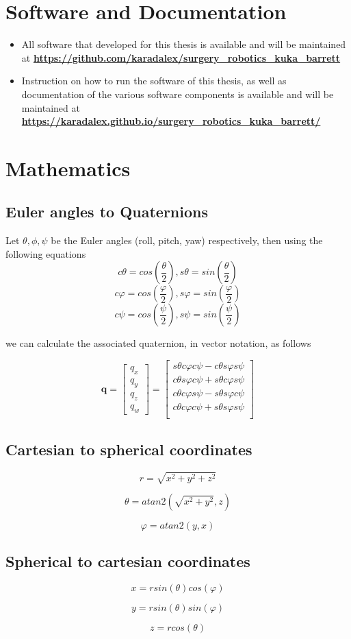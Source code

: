 \section{Software and Documentation}

\begin{itemize}
\item All software that developed for this thesis is available and will be maintained at \textbf{\url{https://github.com/karadalex/surgery_robotics_kuka_barrett}}
\item Instruction on how to run the software of this thesis, as well as documentation of the various software components is available and will be maintained at 
	\textbf{\url{https://karadalex.github.io/surgery_robotics_kuka_barrett/}}
\end{itemize}

\section{Mathematics}

\subsection{Euler angles to Quaternions}

Let $\theta, \phi, \psi$ be the Euler angles (roll, pitch, yaw) respectively, then using the following equations
\[
cθ = cos\left( \frac{θ}{2} \right) , sθ = sin\left( \frac{θ}{2} \right)
\]
\[
cφ = cos\left( \frac{φ}{2} \right) , sφ = sin\left( \frac{φ}{2} \right)
\]
\[
cψ = cos\left( \frac{ψ}{2} \right) , sψ = sin\left( \frac{ψ}{2} \right)
\]

we can calculate the associated quaternion, in vector notation, as follows

\[
\mathbf{q} = \begin{bmatrix} q_x \\ q_y \\ q_z \\ q_w \end{bmatrix} = \begin{bmatrix}
sθcφcψ - cθsφsψ \\
cθsφcψ + sθcφsψ \\
cθcφsψ - sθsφcψ \\
cθcφcψ + sθsφsψ \\
\end{bmatrix}
\]

\subsection{Cartesian to spherical coordinates}

\[
r = \sqrt{x^2+y^2+z^2}
\]

\[
θ = atan2(\sqrt{x^2 + y^2}, z)
\]

\[
φ = atan2(y, x)
\]


\subsection{Spherical to cartesian coordinates}

\[
x = rsin(θ)cos(φ)
\]

\[
y = rsin(θ)sin(φ)
\]

\[
z = rcos(θ)
\]

